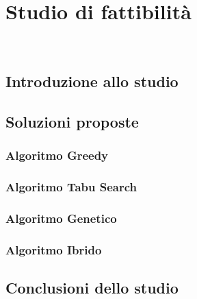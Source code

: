 
\chapter{Studio di fattibilità}
\label{cap:studio-fattibilita}

\\

\section{Introduzione allo studio}

\section{Soluzioni proposte}

\subsection{Algoritmo Greedy}

\subsection{Algoritmo Tabu Search}

\subsection{Algoritmo Genetico}

\subsection{Algoritmo Ibrido}

\section{Conclusioni dello studio}
